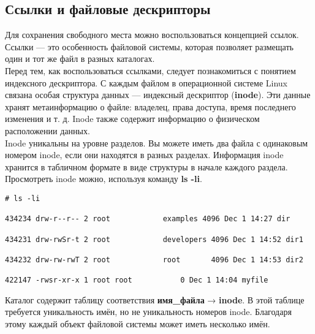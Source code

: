 \documentclass[14pt, a4paper]{article}
\begin{document}
\subsection*{Ссылки и файловые дескрипторы} 

Для сохранения свободного места можно воспользоваться концепцией ссылок. Ссылки — это
особенность файловой системы, которая позволяет размещать один и тот же файл в разных
каталогах.\\

Перед тем, как воспользоваться ссылками, следует познакомиться с понятием индексного
дескриптора. С каждым файлом в операционной системе Linux связана особая структура данных —
индексный дескриптор (\textbf{inode}). Эти данные хранят метаинформацию о файле: владелец, права
доступа, время последнего изменения и т. д. Inode также содержит информацию о физическом
расположении данных.\\

Inode уникальны на уровне разделов. Вы можете иметь два файла с одинаковым номером inode, если
они находятся в разных разделах. Информация inode хранится в табличном формате в виде
структуры в начале каждого раздела. Просмотреть inode можно, используя команду \textbf{ls -li}.

\vspace{0.3cm}

\begin{lstlisting}
# ls -li

434234 drw-r--r-- 2 root            examples 4096 Dec 1 14:27 dir

434231 drw-rwSr-t 2 root            developers 4096 Dec 1 14:52 dir1

434232 drw-rw-rwT 2 root            root       4096 Dec 1 14:53 dir2

422147 -rwsr-xr-x 1 root root           0 Dec 1 14:04 myfile

\end{lstlisting}

\vspace{0.2cm}

Каталог содержит таблицу соответствия \textbf{имя\_файла} → \textbf{inode}. В этой таблице требуется уникальность
имён, но не уникальность номеров inode. Благодаря этому каждый объект файловой системы может
иметь несколько имён.\\
\end{document}
